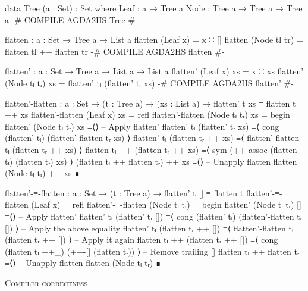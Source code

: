 \documentclass{article}
\begin{document}
\begin{code}
data Tree (a : Set) : Set where
    Leaf : a → Tree a
    Node : Tree a → Tree a → Tree a
{-# COMPILE AGDA2HS Tree #-}
\end{code}
\begin{code}
flatten : {a : Set} → Tree a → List a
flatten (Leaf x) = x ∷ []
flatten (Node tl tr) = flatten tl ++ flatten tr
{-# COMPILE AGDA2HS flatten #-}
\end{code}
\begin{code}
flatten' : {a : Set } → Tree a → List a → List a
flatten' (Leaf x) xs = x ∷ xs
flatten' (Node tₗ tᵣ) xs = flatten' tₗ (flatten' tᵣ xs)
{-# COMPILE AGDA2HS flatten' #-}
\end{code}
\begin{code}
flatten'-flatten : {a : Set} → (t : Tree a) → (xs : List a)
    → flatten' t xs ≡ flatten t ++ xs
flatten'-flatten (Leaf x) xs = refl
flatten'-flatten (Node tₗ tᵣ) xs =
  begin
    flatten' (Node tₗ tᵣ) xs
  ≡⟨⟩ -- Apply flatten'
    flatten' tₗ (flatten' tᵣ xs)
  ≡⟨ cong (flatten' tₗ) (flatten'-flatten tᵣ xs) ⟩
    flatten' tₗ (flatten tᵣ ++ xs)
  ≡⟨ flatten'-flatten tₗ (flatten tᵣ ++ xs) ⟩
    flatten tₗ ++ (flatten tᵣ ++ xs)
  ≡⟨ sym (++-assoc (flatten tₗ) (flatten tᵣ) xs) ⟩
    (flatten tₗ ++ flatten tᵣ) ++ xs
  ≡⟨⟩ -- Unapply flatten
    flatten (Node tₗ tᵣ) ++ xs
  ∎
\end{code}
\begin{code}
flatten'-≡-flatten : {a : Set} → (t : Tree a)
    → flatten' t [] ≡ flatten t
flatten'-≡-flatten (Leaf x) = refl
flatten'-≡-flatten (Node tₗ tᵣ) =
  begin
    flatten' (Node tₗ tᵣ) []
  ≡⟨⟩ -- Apply flatten'
    flatten' tₗ (flatten' tᵣ [])
  ≡⟨ cong (flatten' tₗ) (flatten'-flatten tᵣ []) ⟩ -- Apply the above equality
    flatten' tₗ (flatten tᵣ ++ [])
  ≡⟨ flatten'-flatten tₗ (flatten tᵣ ++ []) ⟩ -- Apply it again
    flatten tₗ ++ (flatten tᵣ ++ [])
  ≡⟨ cong (flatten tₗ ++_) (++-[] (flatten tᵣ)) ⟩ -- Remove trailing []
    flatten tₗ ++ flatten tᵣ
  ≡⟨⟩ -- Unapply flatten
    flatten (Node tₗ tᵣ)
  ∎
\end{code}

\noindent
\textsc{Compiler correctness}
\end{document}

